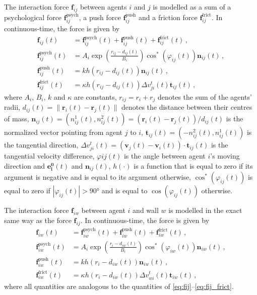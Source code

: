 The interaction force $\bm{f}_{ij}$ between agents $i$ and $j$ is modelled as a sum of a psychological force $\bm{f}_{ij}^{\mathrm{psych}}$, a push force $\bm{f}_{ij}^{\mathrm{push}}$ and a friction force $\bm{f}_{ij}^{\mathrm{frict}}$. In continuous-time, the force is given by
\begin{subequations}
\begin{align} 
	\bm{f}_{ij}(t) & = \bm{f}_{ij}^{\mathrm{psych}}(t) + \bm{f}_{ij}^{\mathrm{push}}(t) + \bm{f}_{ij}^{\mathrm{frict}}(t) \,, \label{eq:fij} \\
	\bm{f}_{ij}^{\mathrm{psych}}(t) & = A_i \exp\left(\frac{r_{ij}-d_{ij}(t)}{B_i}\right) \cos^*(\varphi_{ij}(t)) \bm{n}_{ij}(t) \,, \label{eq:fij_psych} \\
	\bm{f}_{ij}^{\mathrm{push}}(t) & = k h(r_{ij}-d_{ij}(t)) \bm{n}_{ij}(t) \,, \label{eq:fij_pusj} \\
	\bm{f}_{ij}^{\mathrm{frict}}(t) & = \kappa h(r_{ij}-d_{ij}(t)) \Delta v_{ji}^t(t) \bm{t}_{ij}(t) \,, \label{eq:fij_frict}
\end{align}
\end{subequations}
where $A_i$, $B_i$, $k$ and $\kappa$ are constants, $r_{ij}=r_i+r_j$ denotes the sum of the agents' radii, $d_{ij}(t)=\lVert \bm{r}_i(t)-\bm{r}_j(t) \rVert$ denotes the distance between their centres of mass, $\bm{n}_{ij}(t)=(n_{ij}^1(t),n_{ij}^2(t))=(\bm{r}_i(t)-\bm{r}_j(t))/d_{ij}(t)$ is the normalized vector pointing from agent $j$ to $i$, $\bm{t}_{ij}(t)=(-n_{ij}^2(t),n_{ij}^1(t))$ is the tangential direction, $\Delta v_{ji}^t(t)=(\bm{v}_j(t)-\bm{v}_i(t))\cdot\bm{t}_{ij}(t)$ is the tangential velocity difference, $\varphi{ij}(t)$ is the angle between agent $i$'s moving direction and $\bm{e_i^0}(t)$ and $\bm{n}_{ij}(t)$, $h(\cdot)$ is a function that is equal to zero if its argument is negative and is equal to its argument otherwise, $\cos^*(\varphi_{ij}(t))$ is equal to zero if $|\varphi_{ij}(t)| > \ang{90}$ and is equal to $\cos(\varphi_{ij}(t))$ otherwise. 

The interaction force $\bm{f}_{iw}$ between agent $i$ and wall $w$ is modelled in the exact same way as the force $\bm{f}_{ij}$. In continuous-time, the force is given by
\begin{subequations}
\begin{align}
	\bm{f}_{iw}(t) & = \bm{f}_{iw}^{\mathrm{psych}}(t) + \bm{f}_{iw}^{\mathrm{push}}(t) + \bm{f}_{iw}^{\mathrm{frict}}(t) \,, \label{eq:fiw} \\
	\bm{f}_{iw}^{\mathrm{psych}}(t) & = A_i \exp\left(\frac{r_{i}-d_{iw}(t)}{B_i}\right) \cos^*(\varphi_{iw}(t)) \bm{n}_{iw}(t) \,, \label{eq:fiw_psych} \\
	\bm{f}_{iw}^{\mathrm{push}}(t) & = k h(r_{i}-d_{iw}(t)) \bm{n}_{iw}(t) \,, \label{eq:fiw_push} \\ 
	\bm{f}_{iw}^{\mathrm{frict}}(t) & = \kappa h(r_{i}-d_{iw}(t)) \Delta v_{wi}^t(t) \bm{t}_{iw}(t) \,, \label{eq:fiw_frict}
\end{align}
\end{subequations}
where all quantities are analogous to the quantities of \eqref{eq:fij}--\eqref{eq:fij_frict}.

